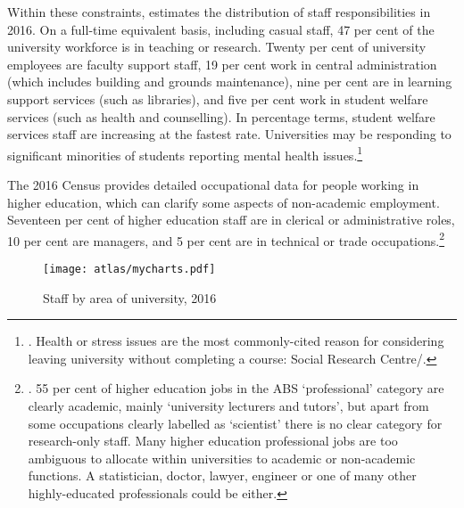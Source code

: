 \documentclass{grattan}
\begin{document}
Within these constraints,  estimates the distribution of staff responsibilities in 2016. On a full-time equivalent basis, including casual staff, 47 per cent of the university workforce is in teaching or research. Twenty per cent of university employees are faculty support staff, 19 per cent work in central administration (which includes building and grounds maintenance), nine per cent are in learning support services (such as libraries), and five per cent work in student welfare services (such as health and counselling). In percentage terms, student welfare services staff are increasing at the fastest rate. Universities may be responding to significant minorities of students reporting mental health issues.\footnote{\textcite[][]{Cvetkovski2012theprevalenceand}. Health or stress issues are the most commonly-cited reason for considering leaving university without completing a course: Social Research Centre/\textcite[][29]{DepartmentofEducationandTraining20182017graduateoutco}.}

The 2016 Census provides detailed occupational data for people working in higher education, which can clarify some aspects of non-academic employment. Seventeen per cent of higher education staff are in clerical or administrative roles, 10 per cent are managers, and 5 per cent are in technical or trade occupations.\footnote{\textcite[][]{ABS2017censusofpopulatio}. 55 per cent of higher education jobs in the ABS `professional' category are clearly academic, mainly `university lecturers and tutors', but apart from some occupations clearly labelled as `scientist' there is no clear category for research-only staff. Many higher education professional jobs are too ambiguous to allocate within universities to academic or non-academic functions. A statistician, doctor, lawyer, engineer or one of many other highly-educated professionals could be either.}


    \begin{figure} %
    \caption{Staff by area of university, 2016}\label{fig:staff-by-area-of-university-2016}
    \texttt{[image: atlas/mycharts.pdf]}
    \end{figure}
\end{document}
